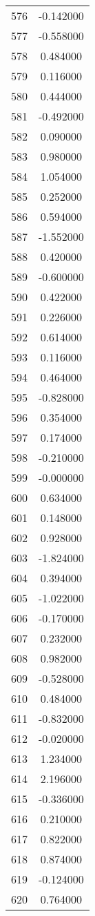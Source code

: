 \documentclass[12pt]{article}
\begin{document}
\begin{longtable}{@{}cc@{}}
576 & -0.142000 \\
577 & -0.558000 \\
578 & 0.484000 \\
579 & 0.116000 \\
580 & 0.444000 \\
581 & -0.492000 \\
582 & 0.090000 \\
583 & 0.980000 \\
584 & 1.054000 \\
585 & 0.252000 \\
586 & 0.594000 \\
587 & -1.552000 \\
588 & 0.420000 \\
589 & -0.600000 \\
590 & 0.422000 \\
591 & 0.226000 \\
592 & 0.614000 \\
593 & 0.116000 \\
594 & 0.464000 \\
595 & -0.828000 \\
596 & 0.354000 \\
597 & 0.174000 \\
598 & -0.210000 \\
599 & -0.000000 \\
600 & 0.634000 \\
601 & 0.148000 \\
602 & 0.928000 \\
603 & -1.824000 \\
604 & 0.394000 \\
605 & -1.022000 \\
606 & -0.170000 \\
607 & 0.232000 \\
608 & 0.982000 \\
609 & -0.528000 \\
610 & 0.484000 \\
611 & -0.832000 \\
612 & -0.020000 \\
613 & 1.234000 \\
614 & 2.196000 \\
615 & -0.336000 \\
616 & 0.210000 \\
617 & 0.822000 \\
618 & 0.874000 \\
619 & -0.124000 \\
620 & 0.764000 \\

\end{longtable}
\end{document}
